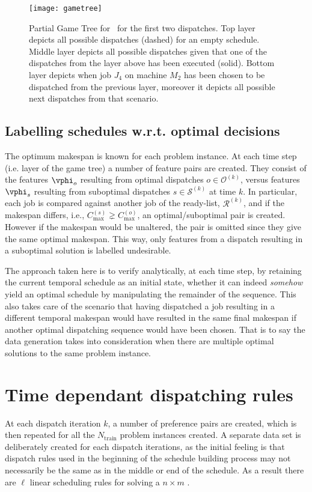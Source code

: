 \begin{figure}
\texttt{[image: gametree]}
\caption[Partial Game Tree for \jsp]{Partial Game Tree for \jsp\ for the first two dispatches. 
Top layer depicts all possible dispatches (dashed) for an empty schedule. 
Middle layer depicts all possible dispatches given that one of the dispatches from the layer above has been executed (solid). 
Bottom layer depicts when job $J_4$ on machine $M_2$ has been chosen to be dispatched from the previous layer, moreover it depicts all possible next dispatches from that scenario.}
\label{fig:jssp:gametree}
\end{figure}

\subsection{Labelling schedules w.r.t. optimal decisions}\label{sec:gentrdat:labelling}
The optimum makespan is known for each problem instance. 
At each time step (i.e. layer of the game tree) a number of feature pairs are created. 
They consist of the features $\vphi_o$ resulting from optimal dispatches $o\in\mathcal{O}^{(k)}$, versus features $\vphi_s$ resulting from suboptimal dispatches $s\in\mathcal{S}^{(k)}$ at time $k$. 
In particular, each job is compared against another job of the ready-list, $\mathcal{R}^{(k)}$, and if the makespan differs, i.e., $C_{\max}^{(s)}\gneq C_{\max}^{(o)}$, an optimal/suboptimal pair is created. 
However if the makespan would be unaltered, the pair is omitted since they give the same optimal makespan. 
This way, only features from a dispatch resulting in a suboptimal solution is labelled undesirable.

The approach taken here is to verify analytically, at each time step, by retaining the current temporal schedule as an initial state, whether it can indeed \emph{somehow} yield an optimal schedule by manipulating the remainder of the sequence. 
This also takes care of the scenario that having dispatched a job resulting in a different temporal makespan would have resulted in the same final makespan if another optimal dispatching sequence would have been chosen. 
That is to say the data generation takes into consideration when there are multiple optimal solutions to the same problem instance. 

\section{Time dependant dispatching rules}
At each dispatch iteration $k$, a number of preference pairs are created, which is then repeated for all the $N_{\text{train}}$ problem instances created. 
A separate data set is deliberately created for each dispatch iterations, as the initial feeling is that dispatch rules used in the beginning of the schedule building process may not necessarily be the same as in the middle or end of the schedule. As a result there are $\ell$ linear scheduling rules for solving a $n \times m$ \jsp. 

